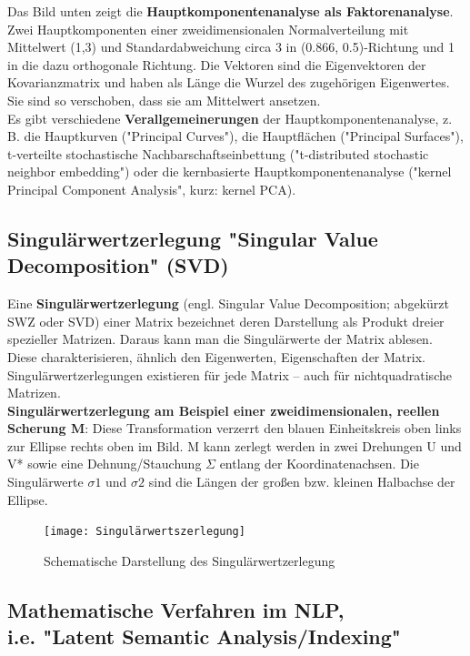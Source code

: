 \documentclass[12pt]{article}
\begin{document}
Das Bild unten zeigt die \textbf{Hauptkomponentenanalyse als Faktorenanalyse}.\\ Zwei Hauptkomponenten einer zweidimensionalen Normalverteilung mit Mittelwert (1,3) und Standardabweichung circa 3 in (0.866, 0.5)-Richtung und 1 in die dazu orthogonale Richtung. Die Vektoren sind die Eigenvektoren der Kovarianzmatrix und haben als Länge die Wurzel des zugehörigen Eigenwertes. Sie sind so verschoben, dass sie am Mittelwert ansetzen. \\[0.2cm]
Es gibt verschiedene \textbf{Verallgemeinerungen} der Hauptkomponentenanalyse, z. B. die Hauptkurven ("Principal Curves"), die Hauptflächen ("Principal Surfaces"), t-verteilte stochastische Nachbarschaftseinbettung ("t-distributed stochastic neighbor embedding") oder die kernbasierte Hauptkomponentenanalyse ("kernel Principal Component Analysis", kurz: kernel PCA).\\

\newpage


\subsection{Singulärwertzerlegung "Singular Value Decomposition" (SVD)}

Eine \textbf{Singulärwertzerlegung} (engl. Singular Value Decomposition; abgekürzt SWZ oder SVD) einer Matrix bezeichnet deren Darstellung als Produkt dreier spezieller Matrizen. Daraus kann man die Singulärwerte der Matrix ablesen. Diese charakterisieren, ähnlich den Eigenwerten, Eigenschaften der Matrix. Singulärwertzerlegungen existieren für jede Matrix – auch für nichtquadratische Matrizen.\\
\textbf{Singulärwertzerlegung am Beispiel einer zweidimensionalen, reellen Scherung M}: Diese Transformation verzerrt den blauen Einheitskreis oben links zur Ellipse rechts oben im Bild. M kann zerlegt werden in zwei Drehungen U und V* sowie eine Dehnung/Stauchung $\Sigma$  entlang der Koordinatenachsen. Die Singulärwerte $\sigma1$ und $\sigma2$ sind die Längen der großen bzw. kleinen Halbachse der Ellipse.\\ 
 
\begin{figure}[htb]
  \centering
  \texttt{[image: Singulärwertszerlegung]}
  \caption{Schematische Darstellung des Singulärwertzerlegung}
  \label{fig:svd-bild-1}
\end{figure}

\newpage

\subsection{Mathematische Verfahren im NLP,\\ i.e. "Latent Semantic Analysis/Indexing"}
\end{document}
